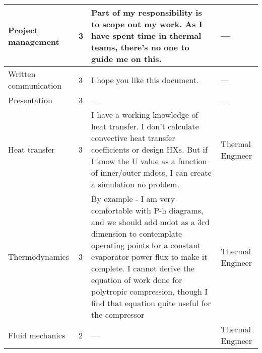 \begin{center}
\begin{tabularx}{\textwidth}{X l X X}
\hline
	Project management & 
	3 & 
	Part of my responsibility is to scope out my work. As I have spent time in thermal teams, there's no one to guide me on this. & 
	--- \\
\hline
	Written communication & 
	3 & 
	I hope you like this document. & 
	--- \\
\hline
	Presentation & 
	3 & 
	--- & 
	--- \\
\hline
	Heat transfer & 
	3 & 
	I have a working knowledge of heat transfer. I don't calculate convective heat transfer coefficients or design HXs. But if I know the U value as a function of inner/outer mdots, I can create a simulation no problem. 		& 
	Thermal Engineer \\
\hline
	Thermodynamics & 
	3 & 
	By example - I am very comfortable with P-h diagrams, and we should add mdot as a 3rd dimension to 		contemplate operating points for a constant evaporator power flux to make it complete. I cannot derive the 	equation of work done for polytropic compression, though I find that equation quite useful for the 			compressor & 
	Thermal Engineer \\
\hline
Fluid mechanics & 2 & --- & Thermal Engineer \\
\hline

\end{tabularx}
\end{center}
